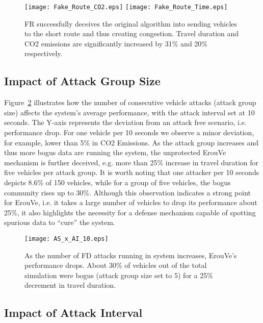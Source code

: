 \documentclass[conference]{IEEEtran}
\begin{document}
\begin{figure}[!htb]
  \centering
    \texttt{[image: Fake\_Route\_CO2.eps]}
    \texttt{[image: Fake\_Route\_Time.eps]}
  \caption{FR successfully deceives the original algorithm into sending vehicles to the short route and thus creating congestion. Travel duration and CO2 emissions are significantly increased by 31\% and 20\% respectively.}
  \label{fake-route}
\end{figure}



\subsection{Impact of Attack Group Size}

Figure~\ref{group-size} illustrates how the number of consecutive vehicle attacks (attack group size) affects the system's average performance, with the attack interval set at 10 seconds. The Y-axis represents the deviation from an attack free scenario, i.e. performance drop. For one vehicle per 10 seconds we observe a minor deviation, for example, lower than 5\% in CO2 Emissions. As the attack group increases and thus more bogus data are running the system, the unprotected ErouVe mechanism is further deceived, e.g. more than 25\% increase in travel duration for five vehicles per attack group. It is worth noting that one attacker 
per 10 seconds depicts 8.6\% of 150 vehicles, while for a group of five vehicles, the bogus community rises up to 30\%. Although this observation indicates a strong point for ErouVe, i.e. it takes a large number of vehicles to drop its performance about 25\%, it also
highlights the necessity for a defense mechanism capable of spotting spurious data to ``cure'' the system.


\begin{figure}[!htb]
  \centering
     \texttt{[image: AS\_x\_AI\_10.eps]}
  \caption{As the number of  FD attacks running in system increases, ErouVe's performance drops. About 30\% of vehicles out of the total simulation were bogus (attack group size set to 5) for a 25\% decrement in travel duration.}
  \label{group-size}
\end{figure}



\subsection{Impact of Attack Interval}
\end{document}
